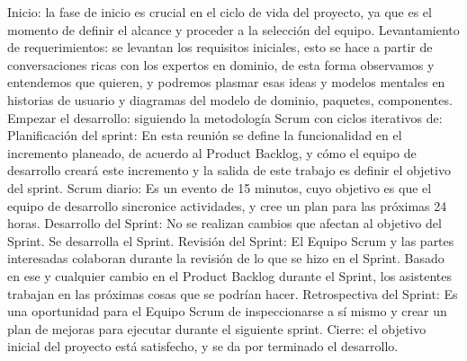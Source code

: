 \documentclass{article}
\begin{document}
Inicio: la fase de inicio es crucial en el ciclo de vida del proyecto, ya que es el momento de definir el alcance y proceder a la selección del equipo.
Levantamiento de requerimientos: se levantan los requisitos iniciales, esto se hace a partir de conversaciones ricas con los expertos en dominio, de esta forma observamos y entendemos que quieren, y podremos plasmar esas ideas y modelos mentales en historias de usuario y diagramas del modelo de dominio, paquetes, componentes.
Empezar el desarrollo: siguiendo la metodología Scrum con ciclos iterativos de:
Planificación del sprint: En esta reunión se define la funcionalidad en el incremento planeado, de acuerdo al Product Backlog, y cómo el equipo de desarrollo creará este incremento y la salida de este trabajo es definir el objetivo del sprint.
Scrum diario: Es un evento de 15 minutos, cuyo objetivo es que el equipo de desarrollo sincronice actividades, y cree un plan para las próximas 24 horas.
Desarrollo del Sprint: No se realizan cambios que afectan al objetivo del Sprint. Se desarrolla el Sprint.
Revisión del Sprint: El Equipo Scrum y las partes interesadas colaboran durante la revisión de lo que se hizo en el Sprint. Basado en ese y cualquier cambio en el Product Backlog durante el Sprint, los asistentes trabajan en las próximas cosas que se podrían hacer.
Retrospectiva del Sprint: Es una oportunidad para el Equipo Scrum de inspeccionarse a sí mismo y crear un plan de mejoras para ejecutar durante el siguiente sprint.
Cierre: el objetivo inicial del proyecto está satisfecho, y se da por terminado el desarrollo.
\end{document}
